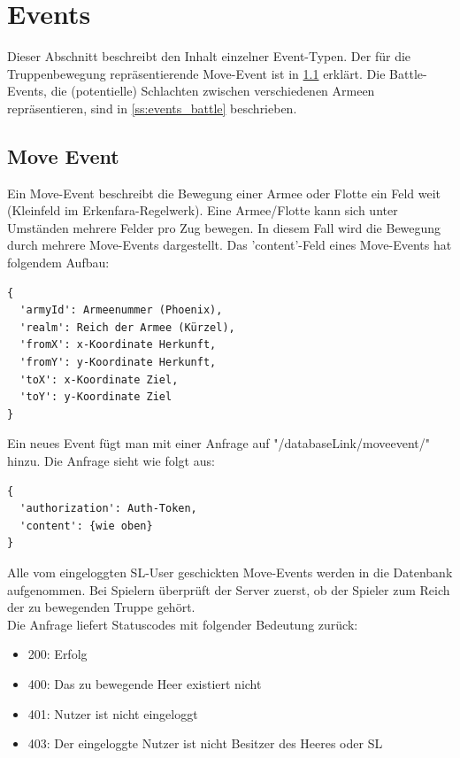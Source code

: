 \documentclass[11pt,a4paper,twocolumn]{article}
\begin{document}
\section{Events}\label{s:events}
Dieser Abschnitt beschreibt den Inhalt einzelner Event-Typen. Der für die Truppenbewegung repräsentierende Move-Event ist in \ref{ss:events_move} erklärt. Die Battle-Events, die (potentielle) Schlachten zwischen verschiedenen Armeen repräsentieren, sind in \ref{ss:events_battle} beschrieben.
\subsection{Move Event}\label{ss:events_move}
Ein Move-Event beschreibt die Bewegung einer Armee oder Flotte ein Feld weit (Kleinfeld im Erkenfara-Regelwerk). Eine Armee/Flotte kann sich unter Umständen mehrere Felder pro Zug bewegen. In diesem Fall wird die Bewegung durch mehrere Move-Events dargestellt. Das 'content'-Feld eines Move-Events hat folgendem Aufbau:
\begin{lstlisting}
{
  'armyId': Armeenummer (Phoenix),
  'realm': Reich der Armee (Kürzel),
  'fromX': x-Koordinate Herkunft,
  'fromY': y-Koordinate Herkunft,
  'toX': x-Koordinate Ziel,
  'toY': y-Koordinate Ziel
}
\end{lstlisting}
Ein neues Event fügt man mit einer Anfrage auf "/databaseLink/moveevent/" hinzu. Die Anfrage sieht wie folgt aus:
\begin{lstlisting}
{
  'authorization': Auth-Token,
  'content': {wie oben}
}
\end{lstlisting}
Alle vom eingeloggten SL-User geschickten Move-Events werden in die Datenbank aufgenommen. Bei Spielern überprüft der Server zuerst, ob der Spieler zum Reich der zu bewegenden Truppe gehört.\\
Die Anfrage liefert Statuscodes mit folgender Bedeutung zurück:
\begin{itemize}
\item 200: Erfolg
\item 400: Das zu bewegende Heer existiert nicht
\item 401: Nutzer ist nicht eingeloggt
\item 403: Der eingeloggte Nutzer ist nicht Besitzer des Heeres oder SL
\end{itemize}
\end{document}
